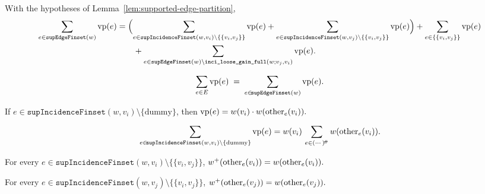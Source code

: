 \begin{lemma}\label{lem:supported-sum-split}
With the hypotheses of Lemma~\ref{lem:supported-edge-partition},
\begin{align*}
    \sum_{e\in \texttt{supEdgeFinset}(w)} \operatorname{vp}(e)
  &= \Bigl(\sum_{e\in \texttt{supIncidenceFinset}(w,v_i)\setminus\{\{v_i,v_j\}\}} \operatorname{vp}(e)
    + \sum_{e\in \texttt{supIncidenceFinset}(w,v_j)\setminus\{\{v_i,v_j\}\}} \operatorname{vp}(e)\Bigr)
     + \sum_{e\in\{\{v_i,v_j\}\}} \operatorname{vp}(e)\\
  &\qquad + \sum_{e\in \texttt{supEdgeFinset}(w)\setminus \texttt{inci\_loose\_gain\_full}(w;v_j,v_i)} \operatorname{vp}(e).
\end{align*}
\leanok
\end{lemma}

\begin{lemma}\label{lem:sum-over-support}
\[\sum_{e\in E} \operatorname{vp}(e)\;=\;\sum_{e\in \!\texttt{supEdgeFinset}(w)} \operatorname{vp}(e).\]
\leanok
\end{lemma}

\begin{lemma}\label{lem:vp-gain-edge}
If $e\in \!\texttt{supIncidenceFinset}(w,v_i)\setminus\{\text{dummy}\}$, then
\(\operatorname{vp}(e)=w(v_i)\cdot w(\operatorname{other}_e(v_i)).\)
\leanok
\end{lemma}

\begin{lemma}\label{lem:sum-gain-factor}
\[
  \sum_{e\in \!\texttt{supIncidenceFinset}(w,v_i)\setminus\{\text{dummy}\}} \operatorname{vp}(e)
  = w(v_i)\, \sum_{e\in (\cdots)^{\!\#}} w(\operatorname{other}_e(v_i)).
\]
\leanok
\end{lemma}

\begin{lemma}\label{lem:enhance-other-gain}
For every $e\in \!\texttt{supIncidenceFinset}(w,v_i)\setminus\{\{v_i,v_j\}\}$,
\( w^+(\operatorname{other}_e(v_i))=w(\operatorname{other}_e(v_i)). \)
\leanok
\end{lemma}

\begin{lemma}\label{lem:enhance-other-loose}
For every $e\in \!\texttt{supIncidenceFinset}(w,v_j)\setminus\{\{v_i,v_j\}\}$,
\( w^+(\operatorname{other}_e(v_j))=w(\operatorname{other}_e(v_j)). \)
\leanok
\end{lemma}

